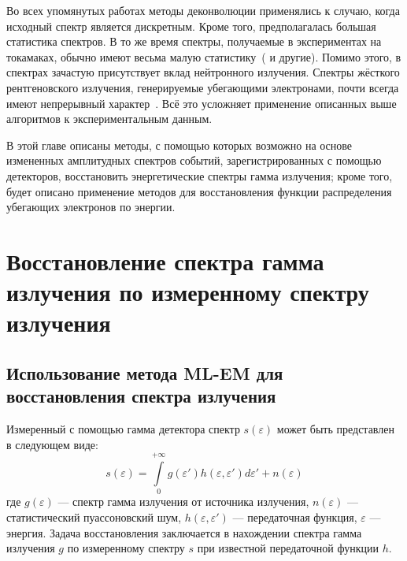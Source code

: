 Во всех упомянутых работах методы деконволюции применялись к случаю, когда исходный спектр является дискретным. Кроме того, предполагалась большая статистика спектров. В то же время спектры, получаемые в экспериментах на токамаках, обычно имеют весьма малую статистику~(\cite{Khilkevitch2013,Shevelev2018,Reux2022,Chugunov2011,Shevelev2013} и другие). Помимо этого, в спектрах зачастую присутствует вклад нейтронного излучения. Спектры жёсткого рентгеновского излучения, генерируемые убегающими электронами, почти всегда имеют непрерывный характер~\cite{Shevelev2013}. Всё это усложняет применение описанных выше алгоритмов к экспериментальным данным.~\cite{Khilkevitch2013} 

В этой главе описаны методы, с помощью которых возможно на основе измененных амплитудных спектров событий, зарегистрированных с помощью детекторов, восстановить энергетические спектры гамма излучения; кроме того, будет описано применение методов для восстановления функции распределения убегающих электронов по энергии.


\section{ Восстановление спектра гамма излучения по измеренному спектру излучения }


\subsection{ Использование метода ML-EM для восстановления спектра излучения }

Измеренный с помощью гамма детектора спектр $s(\varepsilon)$ может быть представлен в следующем виде:
\begin{equation}
  \label{eq:BaseConvolution}
  s(\varepsilon) = \int \limits_0^{+\infty} g( \varepsilon' ) h( \varepsilon, \varepsilon' ) d \varepsilon' + n(\varepsilon)
\end{equation}
где $g(\varepsilon)$ --- спектр гамма излучения от источника излучения, $n(\varepsilon)$ --- статистический пуассоновский шум, $ h( \varepsilon, \varepsilon' ) $ --- передаточная функция, $\varepsilon$ --- энергия. Задача восстановления заключается в нахождении спектра гамма излучения $g$ по измеренному спектру $s$ при известной передаточной функции $h$.~\cite{Khilkevitch2013}

